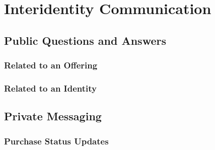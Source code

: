 \chapter{Interidentity Communication}

\section{Public Questions and Answers}

\subsection{Related to an Offering}

\subsection{Related to an Identity}

\section{Private Messaging}

\subsection{Purchase Status Updates}
